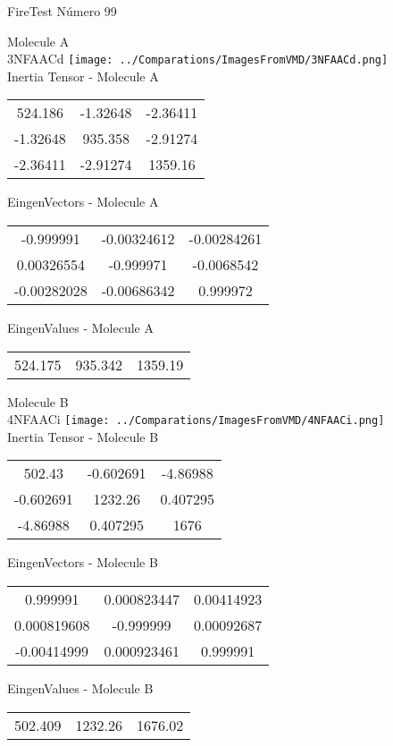\vtab[-2cm]
\begin{center}
{\large FireTest \tab Número 99}
\end{center}
\begin{multicols}{2}
\begin{center}

Molecule A \\ 
3NFAACd
\texttt{[image: ../Comparations/ImagesFromVMD/3NFAACd.png]}
\\
Inertia Tensor - Molecule A \\
\vtab

\begin{tabular}{|c c c|}
524.186	 & 	-1.32648	 & 	-2.36411	 \\
-1.32648	 & 	935.358	 & 	-2.91274	 \\
-2.36411	 & 	-2.91274	 & 	1359.16
\end{tabular}

\vtab
 EingenVectors - Molecule A     \\
\vtab
\begin{tabular}{|c c c|}
-0.999991	 & 	-0.00324612	 & 	-0.00284261	 \\
0.00326554	 & 	-0.999971	 & 	-0.0068542	 \\
-0.00282028	 & 	-0.00686342	 & 	0.999972
\end{tabular}

\vtab
 EingenValues - Molecule A     \\
\vtab
\begin{tabular}{|c c c|}
524.175	 & 	935.342	 & 	1359.19	 \\
\end{tabular}
\columnbreak

Molecule B \\ 
4NFAACi
\texttt{[image: ../Comparations/ImagesFromVMD/4NFAACi.png]}
\\
Inertia Tensor - Molecule B \\
\vtab

\begin{tabular}{|c c c|}
502.43	 & 	-0.602691	 & 	-4.86988	 \\
-0.602691	 & 	1232.26	 & 	0.407295	 \\
-4.86988	 & 	0.407295	 & 	1676
\end{tabular}

\vtab
 EingenVectors - Molecule B     \\
\vtab
\begin{tabular}{|c c c|}
0.999991	 & 	0.000823447	 & 	0.00414923	 \\
0.000819608	 & 	-0.999999	 & 	0.00092687	 \\
-0.00414999	 & 	0.000923461	 & 	0.999991
\end{tabular}

\vtab
 EingenValues - Molecule B     \\
\vtab
\begin{tabular}{|c c c|}
502.409	 & 	1232.26	 & 	1676.02	 \\
\end{tabular}

\end{center}
\end{multicols}
